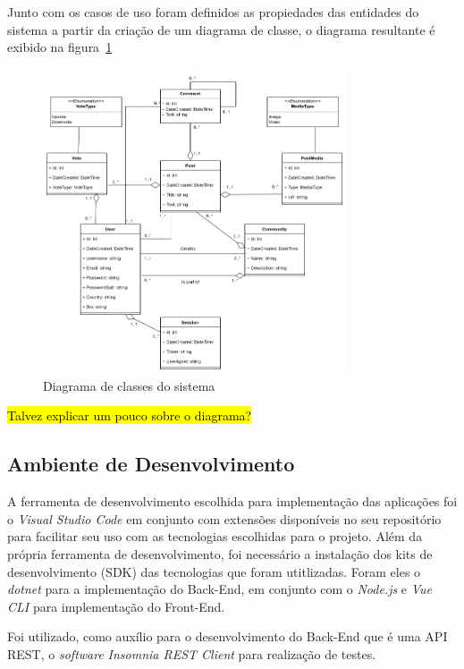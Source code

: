 \documentclass[12pt]{article}
\begin{document}
Junto com os casos de uso foram definidos as propiedades das entidades do sistema
a partir da criação de um diagrama de classe, o diagrama resultante é exibido na figura~\ref{fig:classes_diagram}

\begin{figure}[H]
    \centering
    \includegraphics[width=0.8\textwidth]{diagrams/classes_diagram.png}
    \caption{Diagrama de classes do sistema}\label{fig:classes_diagram}
\end{figure}

\hl{Talvez explicar um pouco sobre o diagrama?}

\subsection{Ambiente de Desenvolvimento}

A ferramenta de desenvolvimento escolhida para implementação
das aplicações foi o \textit{Visual Studio Code} em conjunto com extensões disponíveis
no seu repositório para facilitar seu uso com as tecnologias escolhidas para o projeto. Além
da própria ferramenta de desenvolvimento, foi necessário a instalação dos kits de desenvolvimento
(SDK) das tecnologias que foram utitlizadas. Foram eles o \textit{dotnet} para a implementação do Back-End,
em conjunto com o \textit{Node.js} e \textit{Vue CLI} para implementação do Front-End.

Foi utilizado, como auxílio para o desenvolvimento do Back-End que é uma API REST, o
\textit{software} \textit{Insomnia REST Client} para realização de testes.
\end{document}
